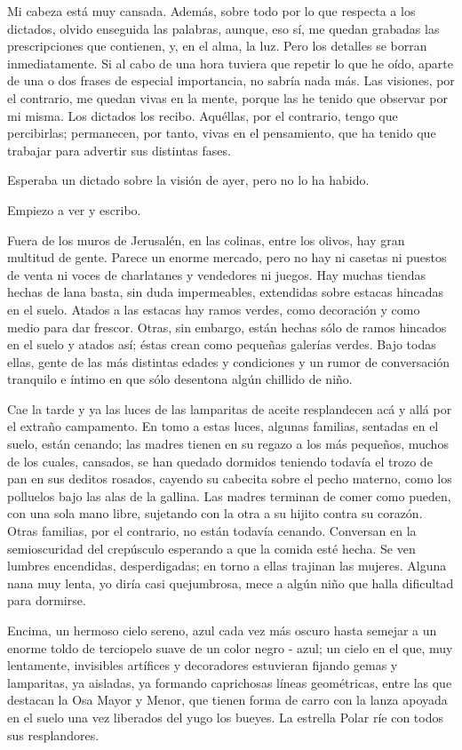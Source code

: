 \documentclass[12pt]{book} %
\begin{document}
Mi cabeza está muy cansada. Además, sobre todo por lo que respecta a los dictados, olvido enseguida las palabras, aunque, eso sí, me quedan grabadas las prescripciones que contienen, y, en el alma, la luz. Pero los detalles se borran inmediatamente. Si al cabo de una hora tuviera que repetir lo que he oído, aparte de una o dos frases de especial importancia, no sabría nada más. Las visiones, por el contrario, me quedan vivas en la mente, porque las he tenido que observar por mi misma. Los dictados los recibo. Aquéllas, por el contrario, tengo que percibirlas; permanecen, por tanto, vivas en el pensamiento, que ha tenido que trabajar para advertir sus distintas fases. 

Esperaba un dictado sobre la visión de ayer, pero no lo ha habido. 

Empiezo a ver y escribo. 

Fuera de los muros de Jerusalén, en las colinas, entre los olivos, hay gran multitud de gente. Parece un enorme mercado, pero no hay ni casetas ni puestos de venta ni voces de charlatanes y vendedores ni juegos. Hay muchas tiendas hechas de lana basta, sin duda impermeables, extendidas sobre estacas hincadas en el suelo. Atados a las estacas hay ramos verdes, como decoración y como medio para dar frescor. Otras, sin embargo, están hechas sólo de ramos hincados en el suelo y atados así; éstas crean como pequeñas galerías verdes. Bajo todas ellas, gente de las más distintas edades y condiciones y un rumor de conversación tranquilo e íntimo en que sólo desentona algún chillido de niño. 

Cae la tarde y ya las luces de las lamparitas de aceite resplandecen acá y allá por el extraño campamento. En tomo a estas luces, algunas familias, sentadas en el suelo, están cenando; las madres tienen en su regazo a los más pequeños, muchos de los cuales, cansados, se han quedado dormidos teniendo todavía el trozo de pan en sus deditos rosados, cayendo su cabecita sobre el pecho materno, como los polluelos bajo las alas de la gallina. Las madres terminan de comer como pueden, con una sola mano libre, sujetando con la otra a su hijito contra su corazón. Otras familias, por el contrario, no están todavía cenando. Conversan en la semioscuridad del crepúsculo esperando a que la comida esté hecha. Se ven lumbres encendidas, desperdigadas; en torno a ellas trajinan las mujeres. Alguna nana muy lenta, yo diría casi quejumbrosa, mece a algún niño que halla dificultad para dormirse. 

Encima, un hermoso cielo sereno, azul cada vez más oscuro hasta semejar a un enorme toldo de terciopelo suave de un color negro - azul; un cielo en el que, muy lentamente, invisibles artífices y decoradores estuvieran fijando gemas y lamparitas, ya aisladas, ya formando caprichosas líneas geométricas, entre las que destacan la Osa Mayor y Menor, que tienen forma de carro con la lanza apoyada en el suelo una vez liberados del yugo los bueyes. La estrella Polar ríe con todos sus resplandores. 
\end{document}
